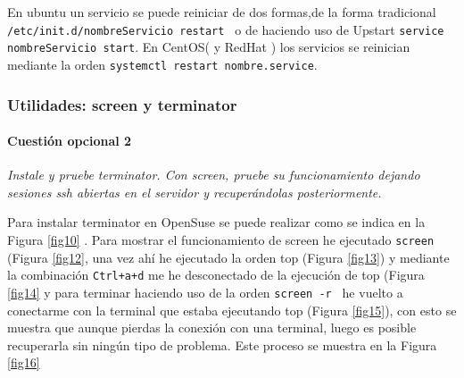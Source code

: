 En ubuntu un servicio se puede reiniciar de dos formas,de la forma tradicional \newline
 \texttt{ /etc/init.d/nombreServicio restart } o de haciendo uso de  Upstart \newline
 \texttt{service nombreServicio start}. \cite{rest1} En CentOS( y RedHat ) los servicios se reinician mediante la orden 
 \texttt{systemctl restart nombre.service}. \cite{rest2}

\subsubsection{Utilidades: screen y terminator}
\paragraph{Cuestión opcional 2}
\textit{Instale y pruebe terminator. Con screen, pruebe su funcionamiento dejando sesiones ssh abiertas en el servidor y recuperándolas posteriormente.}
\newline

Para instalar terminator en OpenSuse se puede realizar como se indica en la Figura \ref{fig10} . Para mostrar el funcionamiento de screen he ejecutado \texttt{screen} (Figura \ref{fig12}, una vez ahí he ejecutado la orden top (Figura \ref{fig13}) y mediante la combinación \texttt{Ctrl+a+d} me he desconectado de la ejecución de top (Figura \ref{fig14} y para terminar haciendo uso de la orden \texttt{screen -r } he vuelto a conectarme con la terminal que estaba ejecutando top (Figura \ref{fig15}), con esto se muestra que aunque pierdas la conexión con una terminal, luego es posible recuperarla sin ningún tipo de problema. Este proceso se muestra en la Figura \ref{fig16}


